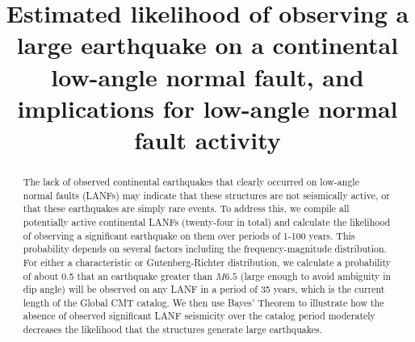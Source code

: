 \documentclass[draft,grl]{AGUTeX}
\begin{document}
\title{Estimated likelihood of observing a large earthquake on a continental 
           low-angle normal fault, and implications for low-angle normal fault
       activity}



\begin{abstract}
The lack of observed continental earthquakes that clearly occurred on low-angle
normal faults (LANFs) may indicate that these structures are not seismically
active, or that these earthquakes are simply rare events. To address this, we
compile all potentially active continental LANFs (twenty-four in total) and
calculate the likelihood of observing a significant earthquake on them over
periods of 1-100 years. This probability depends on several factors including
the frequency-magnitude distribution. For either a characteristic or
Gutenberg-Richter distribution, we calculate a probability of about 0.5 that an
earthquake greater than $M6.5$ (large enough to avoid ambiguity in dip angle)
will be observed on any LANF in a period of 35 years, which is the current
length of the Global CMT catalog. We then use Bayes' Theorem to illustrate how
the absence of observed significant LANF seismicity over the catalog period
moderately decreases the likelihood that the structures generate large
earthquakes.


\end{abstract}
\end{document}

